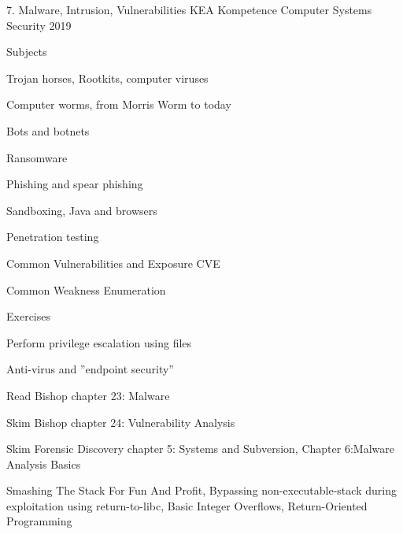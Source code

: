 \documentclass[Screen16to9,17pt]{foils}
\begin{document}
\mytitlepage
{7. Malware, Intrusion, Vulnerabilities}
{KEA Kompetence Computer Systems Security 2019}



\begin{list1}
\item Subjects
\begin{list2}
  \item Trojan horses, Rootkits, computer viruses
  \item Computer worms, from Morris Worm to today
  \item Bots and botnets
  \item Ransomware
  \item Phishing and spear phishing
  \item Sandboxing, Java and browsers
  \item Penetration testing
  \item Common Vulnerabilities and Exposure CVE
  \item Common Weakness Enumeration
\end{list2}
\item Exercises
\begin{list2}
\item Perform privilege escalation using files
\item Anti-virus and ”endpoint security”
\end{list2}
\end{list1}




\begin{list1}
\item Read Bishop chapter 23: Malware
\item Skim Bishop chapter 24: Vulnerability Analysis
\item Skim Forensic Discovery chapter 5: Systems and Subversion, Chapter 6:Malware Analysis Basics
\item Smashing The Stack For Fun And Profit, Bypassing non-executable-stack during exploitation using return-to-libc, Basic Integer Overflows, Return-Oriented Programming

\end{list1}


\end{document}
